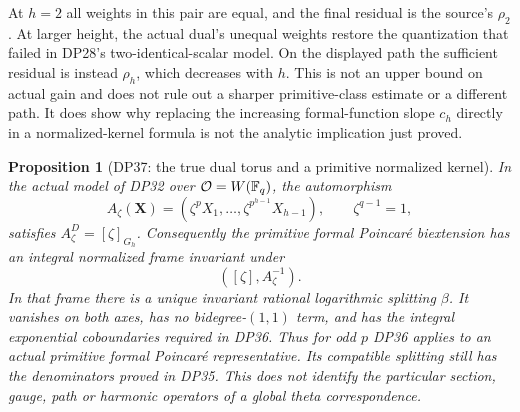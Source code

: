 \documentclass[11pt,a4paper]{article}
\newtheorem{proposition}[theorem]{Proposition}
\theoremstyle{definition}\newtheorem{remark}[theorem]{Remark}
\begin{document}
At $h=2$ all weights in this pair are equal, and the final residual is the source's $\rho_2$. At larger height, the actual dual's unequal weights restore the quantization that failed in DP28's two-identical-scalar model. On the displayed path the sufficient residual is instead $\rho_h$, which decreases with $h$. This is not an upper bound on actual gain and does not rule out a sharper primitive-class estimate or a different path. It does show why replacing the increasing formal-function slope $c_h$ directly in a normalized-kernel formula is not the analytic implication just proved.

\begin{proposition}[DP37: the true dual torus and a primitive normalized kernel]\label{DP37}
In the actual model of DP32 over $\mathcal O=W(\mathbb F_q)$, the automorphism
\[
 A_\zeta(\mathbf X)=(\zeta^pX_1,\ldots,\zeta^{p^{h-1}}X_{h-1}),\qquad\zeta^{q-1}=1,
\]
satisfies $A_\zeta^D=[\zeta]_{G_h}$. Consequently the primitive formal Poincar\'e biextension has an integral normalized frame invariant under
\[
 ([\zeta],A_\zeta^{-1}).
\]
In that frame there is a unique invariant rational logarithmic splitting $\beta$. It vanishes on both axes, has no bidegree-$(1,1)$ term, and has the integral exponential coboundaries required in DP36. Thus for odd $p$ DP36 applies to an actual primitive formal Poincar\'e representative. Its compatible splitting still has the denominators proved in DP35. This does not identify the particular section, gauge, path or harmonic operators of a global theta correspondence.
\end{proposition}
\end{document}
